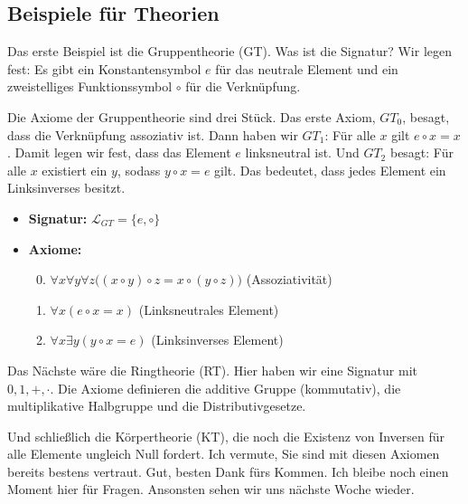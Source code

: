 \subsection{Beispiele für Theorien}

\begin{spoken-clean}[01:21:42 - 01:25:47]
Das erste Beispiel ist die Gruppentheorie (GT). Was ist die Signatur? Wir legen fest: Es gibt ein Konstantensymbol $e$ für das neutrale Element und ein zweistelliges Funktionssymbol $\circ$ für die Verknüpfung.

Die Axiome der Gruppentheorie sind drei Stück. Das erste Axiom, $GT_0$, besagt, dass die Verknüpfung assoziativ ist. Dann haben wir $GT_1$: Für alle $x$ gilt $e \circ x = x$. Damit legen wir fest, dass das Element $e$ linksneutral ist. Und $GT_2$ besagt: Für alle $x$ existiert ein $y$, sodass $y \circ x = e$ gilt. Das bedeutet, dass jedes Element ein Linksinverses besitzt.
\end{spoken-clean}

\begin{math-stroke}
\begin{itemize}
    \item \textbf{Signatur:} $\mathcal{L}_{GT} = \{e, \circ\}$
    \item \textbf{Axiome:}
    \begin{enumerate}[label=\textbf{GT$_{\mathbf{\arabic*}}$:}]
        \setcounter{enumi}{-1}
        \item $\forall x \forall y \forall z \bigl((x \circ y) \circ z = x \circ (y \circ z)\bigr)$ \quad (Assoziativität)
        \item $\forall x (e \circ x = x)$ \quad (Linksneutrales Element)
        \item $\forall x \exists y (y \circ x = e)$ \quad (Linksinverses Element)
    \end{enumerate}
\end{itemize}
\end{math-stroke}

\begin{spoken-clean}[01:25:47 - 01:30:14]
Das Nächste wäre die Ringtheorie (RT). Hier haben wir eine Signatur mit $0, 1, +, \cdot$. Die Axiome definieren die additive Gruppe (kommutativ), die multiplikative Halbgruppe und die Distributivgesetze.

Und schließlich die Körpertheorie (KT), die noch die Existenz von Inversen für alle Elemente ungleich Null fordert. Ich vermute, Sie sind mit diesen Axiomen bereits bestens vertraut. Gut, besten Dank fürs Kommen. Ich bleibe noch einen Moment hier für Fragen. Ansonsten sehen wir uns nächste Woche wieder.
\end{spoken-clean}

